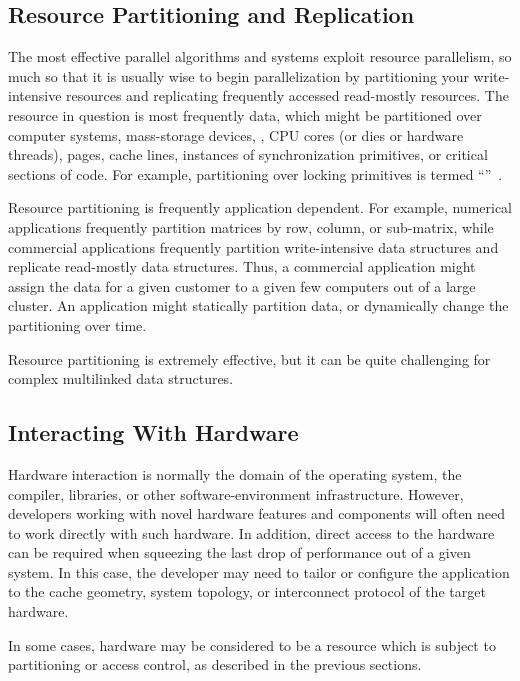 \subsection{Resource Partitioning and Replication}
\label{sec:Resource Partitioning and Replication}

The most effective parallel algorithms and systems exploit resource
parallelism, so much so that it is
usually wise to begin parallelization by partitioning your write-intensive
resources and replicating frequently accessed read-mostly resources.
The resource in question is most frequently data, which might be
partitioned over computer systems, mass-storage devices, ,
CPU cores (or dies or hardware threads), pages, cache lines, instances
of synchronization primitives, or critical sections of code.
For example, partitioning over locking primitives is termed
``''~\cite{Beck85}.

Resource partitioning is frequently application dependent.
For example, numerical applications frequently partition matrices
by row, column, or sub-matrix, while commercial applications frequently
partition write-intensive data structures and replicate
read-mostly data structures.
Thus, a commercial application might assign the data for a
given customer to a given few computers out of a large cluster.
An application might statically partition data, or dynamically
change the partitioning over time.

Resource partitioning is extremely effective, but
it can be quite challenging for complex multilinked data
structures.

\subsection{Interacting With Hardware}
\label{sec:Interacting With Hardware}

Hardware interaction is normally the domain of the operating system,
the compiler, libraries, or other software-environment infrastructure.
However, developers working with novel hardware features and components
will often need to work directly with such hardware.
In addition, direct access to the hardware can be required when squeezing
the last drop of performance out of a given system.
In this case, the developer may need to tailor or configure the application
to the cache geometry, system topology, or interconnect protocol of the
target hardware.

In some cases, hardware may be considered to be a resource which
is subject to partitioning or access control, as described in
the previous sections.

